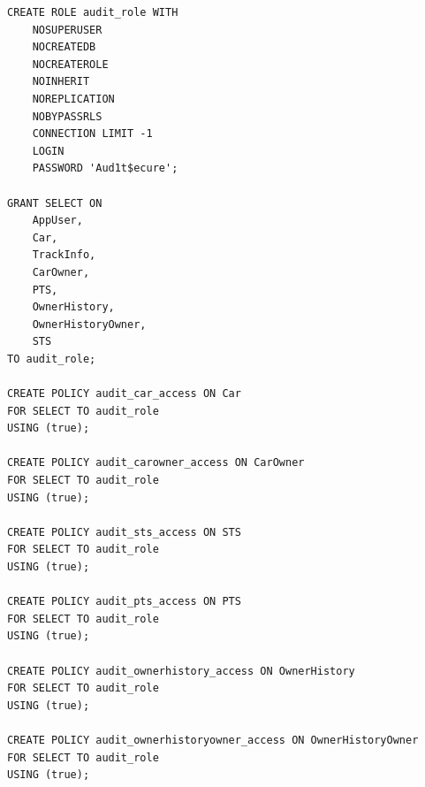 \begin{center}
\captionsetup{justification=raggedright,singlelinecheck=off}
\begin{lstlisting}[label=roles-3, caption=Создание роли аудита]
CREATE ROLE audit_role WITH
    NOSUPERUSER
    NOCREATEDB
    NOCREATEROLE
    NOINHERIT
    NOREPLICATION
    NOBYPASSRLS
    CONNECTION LIMIT -1
    LOGIN
    PASSWORD 'Aud1t$ecure';

GRANT SELECT ON 
    AppUser,
    Car,
    TrackInfo,
    CarOwner,
    PTS,
    OwnerHistory,
    OwnerHistoryOwner,
    STS
TO audit_role;

CREATE POLICY audit_car_access ON Car
FOR SELECT TO audit_role
USING (true);

CREATE POLICY audit_carowner_access ON CarOwner
FOR SELECT TO audit_role
USING (true);

CREATE POLICY audit_sts_access ON STS
FOR SELECT TO audit_role
USING (true);

CREATE POLICY audit_pts_access ON PTS
FOR SELECT TO audit_role
USING (true);

CREATE POLICY audit_ownerhistory_access ON OwnerHistory
FOR SELECT TO audit_role
USING (true);

CREATE POLICY audit_ownerhistoryowner_access ON OwnerHistoryOwner
FOR SELECT TO audit_role
USING (true);
\end{lstlisting}
\end{center}


